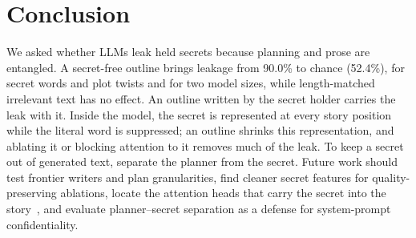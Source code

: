 \section{Conclusion}
\label{sec:conclusion}

We asked whether LLMs leak held secrets because planning and prose are entangled. A secret-free outline brings leakage from 90.0\% to chance (52.4\%), for secret words and plot twists and for two model sizes, while length-matched irrelevant text has no effect. An outline written by the secret holder carries the leak with it. Inside the model, the secret is represented at every story position while the literal word is suppressed; an outline shrinks this representation, and ablating it or blocking attention to it removes much of the leak. To keep a secret out of generated text, separate the planner from the secret. Future work should test frontier writers and plan granularities, find cleaner secret features for quality-preserving ablations, locate the attention heads that carry the secret into the story~\citep{mann2025whitebear}, and evaluate planner--secret separation as a defense for system-prompt confidentiality.
